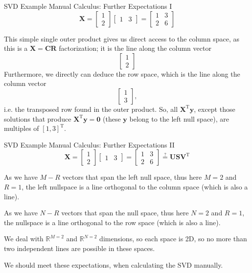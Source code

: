 \documentclass[mathserif, aspectratio=1610]{intbeamer}
\begin{document}
\begin{frame}[t]{SVD Example Manual Calculus: Further Expectations I}
$$\bm{X} =
\begin{bmatrix}
1\\2
\end{bmatrix}
\begin{bmatrix}
1 & 3
\end{bmatrix}
=
\begin{bmatrix}
1 & 3\\
2 & 6
\end{bmatrix}
$$

This simple single outer product gives us direct access to the column space, as this is a $\bm{X}=\bm{C}\bm{R}$ factorization; it is the line along the column vector
$$
\begin{bmatrix}
1\\2
\end{bmatrix}
$$
Furthermore, we directly can deduce the row space, which is the line along the
column vector
$$
\begin{bmatrix}
1\\3
\end{bmatrix},
$$
i.e. the transposed row found in the outer product. So, all $\bm{X}^\mathrm{T} \bm{y}$,
except those solutions that produce $\bm{X}^\mathrm{T} \bm{y} = \bm{0}$ (these $\bm{y}$
belong to the left null space), are multiples of $[1, 3]^\mathrm{T}$.


\end{frame}



\begin{frame}[t]{SVD Example Manual Calculus: Further Expectations II}
$$\bm{X} =
\begin{bmatrix}
1\\2
\end{bmatrix}
\begin{bmatrix}
1 & 3
\end{bmatrix}
=
\begin{bmatrix}
1 & 3\\
2 & 6
\end{bmatrix}
\stackrel{?}{=}
\bm{U}\bm{S}\bm{V}^\mathrm{T}
$$

As we have $M-R$ vectors that span the left null space, thus here $M=2$ and $R=1$,
the left nullspace is a line orthogonal to the column space (which is also a line).

As we have $N-R$ vectors that span the null space, thus here $N=2$ and $R=1$,
the nullspace is a line orthogonal to the row space (which is also a line).

We deal with $\mathbb{R}^{M=2}$ and $\mathbb{R}^{N=2}$ dimensions, so each space
is 2D, so no more than two independent lines are possible in these spaces.

We should meet these expectations, when calculating the SVD manually.

\end{frame}
\end{document}
